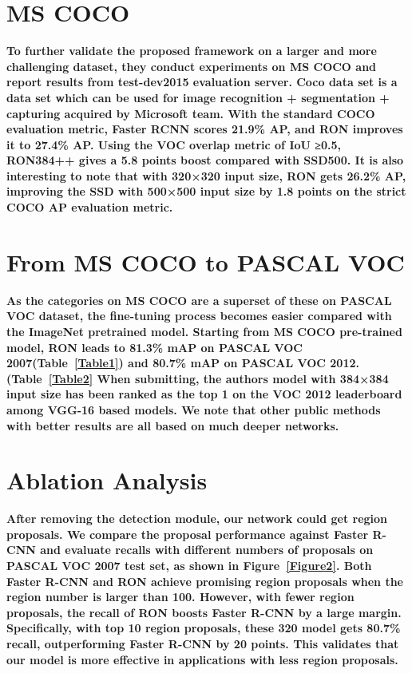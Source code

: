 \documentclass[40pt]{article}
\begin{document}
\section{MS COCO}
\textbf{To further validate the proposed framework on a larger and more challenging dataset, they conduct experiments on MS COCO  and report results from test-dev2015 evaluation server. Coco data set is a data set which can be used for image recognition + segmentation + capturing acquired by Microsoft team. With the standard COCO evaluation metric, Faster RCNN scores 21.9\% AP, and RON improves it to 27.4\% AP. Using the VOC overlap metric of IoU ≥0.5, RON384++ gives a 5.8 points boost compared with SSD500.\cite{name2}  It is also interesting to note that with 320×320 input size, RON gets 26.2\% AP, improving the SSD with 500×500 input size by 1.8 points on the strict COCO AP evaluation metric.
}\\
\section{From MS COCO to PASCAL VOC}
\textbf{As the categories on MS COCO are a superset of these on PASCAL VOC dataset, the ﬁne-tuning process becomes easier compared with the ImageNet pretrained model. Starting from MS COCO pre-trained model, RON leads to 81.3\% mAP on PASCAL VOC 2007(Table~\ref{Table1}) and 80.7\% mAP on PASCAL VOC 2012.(Table~\ref{Table2} When submitting, the authors model with 384×384 input size has been ranked as the top 1 on the VOC 2012 leaderboard among VGG-16 based models. We note that other public methods with better results are all based on much deeper networks.  }
\section{Ablation Analysis}
\textbf{After removing the detection module, our network could get region proposals. We compare the proposal performance against Faster R-CNN\cite{name5} and evaluate recalls with different numbers of proposals on PASCAL VOC 2007 test set, as shown in Figure~\ref{Figure2}. Both Faster R-CNN and RON achieve promising region proposals when the region number is larger than 100. However, with fewer region proposals, the recall of RON boosts Faster R-CNN by a large margin. Speciﬁcally, with top 10 region proposals, these 320 model gets 80.7\% recall, outperforming Faster R-CNN by 20 points. This validates that our model is more effective in applications with less region proposals.
}
\end{document}
